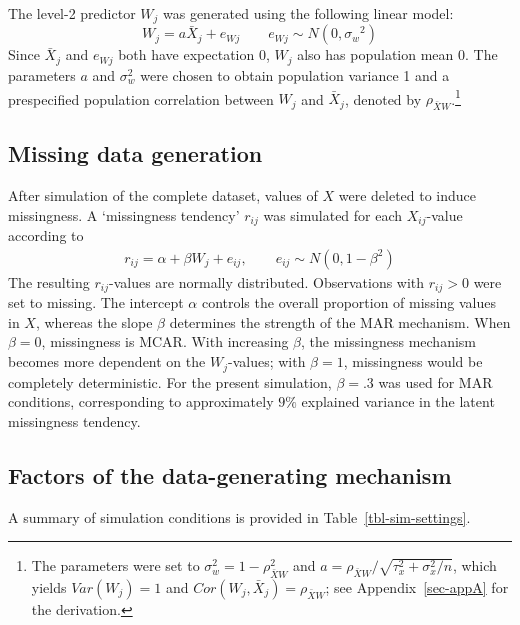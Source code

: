 \documentclass[
  letterpaper,
  11pt,
  english,
  singlespacing,
  headsepline,
  openany]{MastersDoctoralThesis}
\begin{document}
The level-2 predictor \(W_j\) was generated using the following linear
model: \[ 
W_j=a\bar{X}_j + e_{Wj} \qquad 
e_{Wj}\sim N(0,{\sigma_w}^2)
\] Since \(\bar{X}_j\) and \(e_{Wj}\) both have expectation 0, \(W_j\)
also has population mean 0. The parameters \(a\) and \(\sigma_w^2\) were
chosen to obtain population variance 1 and a prespecified population
correlation between \(W_j\) and \(\bar{X}_j\), denoted by
\(\rho_{\bar{X}W}\).\footnote{The parameters were set to
  \(\sigma_w^2 = 1 - \rho_{\bar{X}W}^2\) and
  \(a = \rho_{\bar{X}W}/\sqrt{\tau_x^2 + \sigma_x^2/n}\), which yields
  \(Var(W_j) = 1\) and \(Cor(W_j,\bar{X}_j) = \rho_{\bar{X}W}\); see
  Appendix~\ref{sec-appA} for the derivation.}

\subsection{Missing data generation}\label{missing-data-generation}

After simulation of the complete dataset, values of \(X\) were deleted
to induce missingness. A `missingness tendency' \(r_{ij}\) was simulated
for each \(X_{ij}\)-value according to \[ 
\begin{aligned}
r_{ij}=\alpha+\beta W_j+e_{ij}, \qquad e_{ij}\sim N(0,1-\beta^2)
\end{aligned}
\] The resulting \(r_{ij}\)-values are normally distributed.
Observations with \(r_{ij} > 0\) were set to missing. The intercept
\(\alpha\) controls the overall proportion of missing values in \(X\),
whereas the slope \(\beta\) determines the strength of the MAR
mechanism. When \(\beta = 0\), missingness is MCAR. With increasing
\(\beta\), the missingness mechanism becomes more dependent on the
\(W_j\)-values; with \(\beta = 1\), missingness would be completely
deterministic. For the present simulation, \(\beta = .3\) was used for
MAR conditions, corresponding to approximately \(9\%\) explained
variance in the latent missingness tendency.

\subsection{Factors of the data-generating mechanism}\label{sec-factors}

A summary of simulation conditions is provided in
Table~\ref{tbl-sim-settings}.
\end{document}
